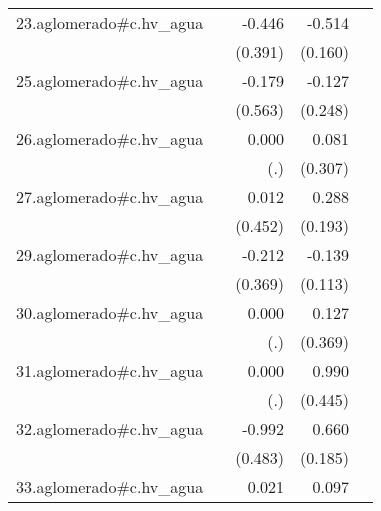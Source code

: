 {\begin{longtable}{l*{4}{D{.}{.}{-1}}}
\addlinespace
23.aglomerado#c.hv\_agua&                     &      -0.446         &      -0.514\sym{**} &                     \\
            &                     &     (0.391)         &     (0.160)         &                     \\
\addlinespace
25.aglomerado#c.hv\_agua&                     &      -0.179         &      -0.127         &                     \\
            &                     &     (0.563)         &     (0.248)         &                     \\
\addlinespace
26.aglomerado#c.hv\_agua&                     &       0.000         &       0.081         &                     \\
            &                     &         (.)         &     (0.307)         &                     \\
\addlinespace
27.aglomerado#c.hv\_agua&                     &       0.012         &       0.288         &                     \\
            &                     &     (0.452)         &     (0.193)         &                     \\
\addlinespace
29.aglomerado#c.hv\_agua&                     &      -0.212         &      -0.139         &                     \\
            &                     &     (0.369)         &     (0.113)         &                     \\
\addlinespace
30.aglomerado#c.hv\_agua&                     &       0.000         &       0.127         &                     \\
            &                     &         (.)         &     (0.369)         &                     \\
\addlinespace
31.aglomerado#c.hv\_agua&                     &       0.000         &       0.990\sym{*}  &                     \\
            &                     &         (.)         &     (0.445)         &                     \\
\addlinespace
32.aglomerado#c.hv\_agua&                     &      -0.992\sym{*}  &       0.660\sym{***}&                     \\
            &                     &     (0.483)         &     (0.185)         &                     \\
\addlinespace
33.aglomerado#c.hv\_agua&                     &       0.021         &       0.097         &                     \\

\end{longtable}}
